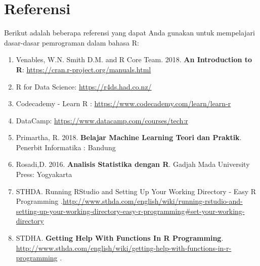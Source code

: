 \documentclass[
]{book}
\newenvironment{Shaded}{\begin{snugshade}}{\end{snugshade}}
\newcommand{\AttributeTok}[1]{\textcolor[rgb]{0.13,0.29,0.53}{#1}}
\newcommand{\CommentTok}[1]{\textcolor[rgb]{0.56,0.35,0.01}{\textit{#1}}}
\newcommand{\ConstantTok}[1]{\textcolor[rgb]{0.56,0.35,0.01}{#1}}
\newcommand{\DecValTok}[1]{\textcolor[rgb]{0.00,0.00,0.81}{#1}}
\newcommand{\FloatTok}[1]{\textcolor[rgb]{0.00,0.00,0.81}{#1}}
\newcommand{\FunctionTok}[1]{\textcolor[rgb]{0.13,0.29,0.53}{\textbf{#1}}}
\newcommand{\NormalTok}[1]{#1}
\newcommand{\OtherTok}[1]{\textcolor[rgb]{0.56,0.35,0.01}{#1}}
\newcommand{\SpecialCharTok}[1]{\textcolor[rgb]{0.81,0.36,0.00}{\textbf{#1}}}
\providecommand{\tightlist}{%
  \setlength{\itemsep}{0pt}\setlength{\parskip}{0pt}}
\begin{document}
\begin{Shaded}
\end{Shaded}

\hypertarget{referensi}{%
\chapter{Referensi}\label{referensi}}

Berikut adalah beberapa referensi yang dapat Anda gunakan untuk mempelajari dasar-dasar pemrograman dalam bahasa R:

\begin{enumerate}
\def\labelenumi{\arabic{enumi}.}
\tightlist
\item
  Venables, W.N. Smith D.M. and R Core Team. 2018. \textbf{An Introduction to R}: \url{https://cran.r-project.org/manuals.html}
\item
  R for Data Science: \url{https://r4ds.had.co.nz/}
\item
  Codecademy - Learn R : \url{https://www.codecademy.com/learn/learn-r}
\item
  DataCamp: \url{https://www.datacamp.com/courses/tech:r}
\item
  Primartha, R. 2018. \textbf{Belajar Machine Learning Teori dan Praktik}. Penerbit Informatika : Bandung
\item
  Rosadi,D. 2016. \textbf{Analisis Statistika dengan R}. Gadjah Mada University Press: Yogyakarta
\item
  STHDA. Running RStudio and Setting Up Your Working Directory - Easy R Programming .\url{http://www.sthda.com/english/wiki/running-rstudio-and-setting-up-your-working-directory-easy-r-programming\#set-your-working-directory}
\item
  STDHA. \textbf{Getting Help With Functions In R Programming}. \url{http://www.sthda.com/english/wiki/getting-help-with-functions-in-r-programming} .
\end{enumerate}

  
\end{document}
